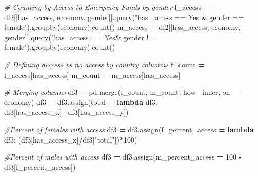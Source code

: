 \documentclass[water,article,submit,moreauthors,pdftex]{mdpi}
\newenvironment{Shaded}{\begin{snugshade}}{\end{snugshade}}
\newcommand{\CommentTok}[1]{\textcolor[rgb]{0.56,0.35,0.01}{\textit{#1}}}
\newcommand{\DecValTok}[1]{\textcolor[rgb]{0.00,0.00,0.81}{#1}}
\newcommand{\KeywordTok}[1]{\textcolor[rgb]{0.13,0.29,0.53}{\textbf{#1}}}
\newcommand{\NormalTok}[1]{#1}
\newcommand{\OperatorTok}[1]{\textcolor[rgb]{0.81,0.36,0.00}{\textbf{#1}}}
\newcommand{\StringTok}[1]{\textcolor[rgb]{0.31,0.60,0.02}{#1}}
\begin{document}
\begin{Shaded}
\begin{Highlighting}[]
\CommentTok{\# Counting by Access to Emergency Funds by gender}
\NormalTok{f\_access }\OperatorTok{=}\NormalTok{ df2[[}\StringTok{\textquotesingle{}has\_access\textquotesingle{}}\NormalTok{, }\StringTok{\textquotesingle{}economy\textquotesingle{}}\NormalTok{, }\StringTok{\textquotesingle{}gender\textquotesingle{}}\NormalTok{]].query(}\StringTok{"has\_access == \textquotesingle{}Yes\textquotesingle{} \& gender == \textquotesingle{}female\textquotesingle{}"}\NormalTok{).groupby(}\StringTok{\textquotesingle{}economy\textquotesingle{}}\NormalTok{).count()}
\NormalTok{m\_access }\OperatorTok{=}\NormalTok{ df2[[}\StringTok{\textquotesingle{}has\_access\textquotesingle{}}\NormalTok{, }\StringTok{\textquotesingle{}economy\textquotesingle{}}\NormalTok{, }\StringTok{\textquotesingle{}gender\textquotesingle{}}\NormalTok{]].query(}\StringTok{"has\_access == \textquotesingle{}Yes\textquotesingle{}\& gender != \textquotesingle{}female\textquotesingle{}"}\NormalTok{).groupby(}\StringTok{\textquotesingle{}economy\textquotesingle{}}\NormalTok{).count()}

\CommentTok{\# Defining acccess vs no access by country columms}
\NormalTok{f\_count }\OperatorTok{=}\NormalTok{ f\_access[}\StringTok{\textquotesingle{}has\_access\textquotesingle{}}\NormalTok{]}
\NormalTok{m\_count }\OperatorTok{=}\NormalTok{ m\_access[}\StringTok{\textquotesingle{}has\_access\textquotesingle{}}\NormalTok{]}
 
\CommentTok{\# Merging columns}
\NormalTok{df3 }\OperatorTok{=}\NormalTok{ pd.merge(f\_count, m\_count, how}\OperatorTok{=}\StringTok{\textquotesingle{}inner\textquotesingle{}}\NormalTok{, on }\OperatorTok{=} \StringTok{\textquotesingle{}economy\textquotesingle{}}\NormalTok{)}
\NormalTok{df3 }\OperatorTok{=}\NormalTok{ df3.assign(total }\OperatorTok{=} \KeywordTok{lambda}\NormalTok{ df3: df3[}\StringTok{\textquotesingle{}has\_access\_x\textquotesingle{}}\NormalTok{]}\OperatorTok{+}\NormalTok{df3[}\StringTok{\textquotesingle{}has\_access\_y\textquotesingle{}}\NormalTok{])}
 
\CommentTok{\#Percent of females with access}
\NormalTok{df3 }\OperatorTok{=}\NormalTok{ df3.assign(f\_percent\_access }\OperatorTok{=} \KeywordTok{lambda}\NormalTok{ df3: (df3[}\StringTok{\textquotesingle{}has\_access\_x\textquotesingle{}}\NormalTok{]}\OperatorTok{/}\NormalTok{df3[}\StringTok{"total"}\NormalTok{])}\OperatorTok{*}\DecValTok{100}\NormalTok{)}
 
\CommentTok{\#Percent of males with access}
\NormalTok{df3 }\OperatorTok{=}\NormalTok{ df3.assign(m\_percent\_access }\OperatorTok{=} \DecValTok{100} \OperatorTok{{-}}\NormalTok{ df3[}\StringTok{\textquotesingle{}f\_percent\_access\textquotesingle{}}\NormalTok{])}
 

\end{Highlighting}
\end{Shaded}
\end{document}
